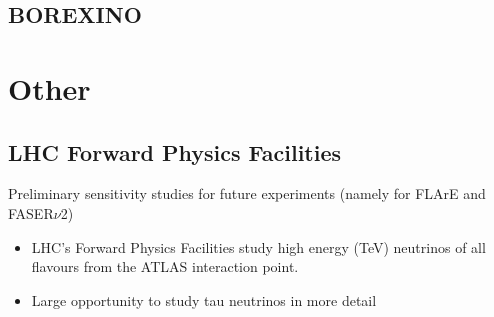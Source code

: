 \documentclass[12pt]{article}
\begin{document}
\subsection{BOREXINO}

\section{Other}
\subsection{LHC Forward Physics Facilities}
Preliminary sensitivity studies for future experiments (namely for FLArE and FASER$\nu$2)
\begin{itemize}
    \item LHC’s Forward Physics Facilities study high energy (TeV) neutrinos of all flavours from the ATLAS interaction point.
    \item Large opportunity to study tau neutrinos in more detail
\end{itemize}



\end{document}
